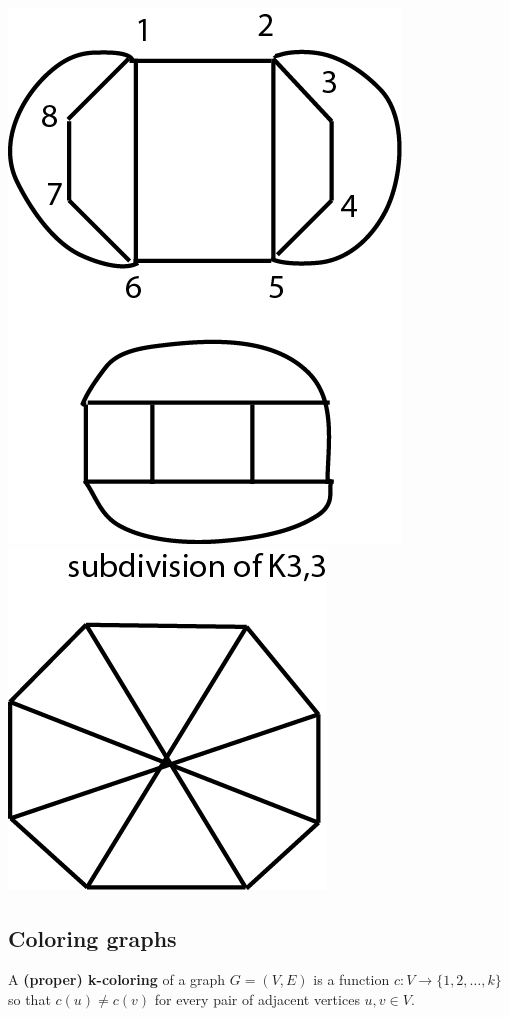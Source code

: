 \documentclass[9pt, letterpaper, oneside]{article}
\begin{document}
\includegraphics{fig22.png}
\includegraphics{fig23.png}

\subsection{Coloring graphs}

A \textbf{(proper) k-coloring} of a graph $G = (V, E)$ is a function $c : V \to \{1, 2, \ldots, k\}$ so that $c(u) \neq c(v)$ for every pair of adjacent vertices $u,v \in V$.
\end{document}
